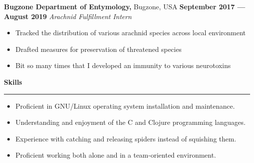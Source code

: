 \documentclass[a4paper, 12pt]{article}
\begin{document}
\begin{flushleft}
{\textbf{Bugzone Department of Entymology,} Bugzone, USA \hfill 
\textbf{September 2017 --- August 2019}}
\newline
\textit{Arachnid Fulfillment Intern}
\begin{itemize}
\item Tracked the distribution of various arachnid species across local environment
\item Drafted measures for preservation of threatened species
\item Bit so many times that I developed an immunity to various neurotoxins
\end{itemize}
\end{flushleft}
\begin{flushleft}
{\fontsize{12pt}{12pt}\selectfont\textbf{Skills}}
\noindent\rule{\textwidth}{0.4pt}
\end{flushleft}
\begin{flushleft}
\begin{multicols}{2}
\begin{itemize}
\item Proficient in GNU/Linux operating system installation and maintenance.
\item Understanding and enjoyment of the C and Clojure programming languages.
\item Experience with catching and releasing spiders instead of squishing them.
\item Proficient working both alone and in a team-oriented environment.
\end{itemize}
\end{multicols}
\end{flushleft}
\end{document}
